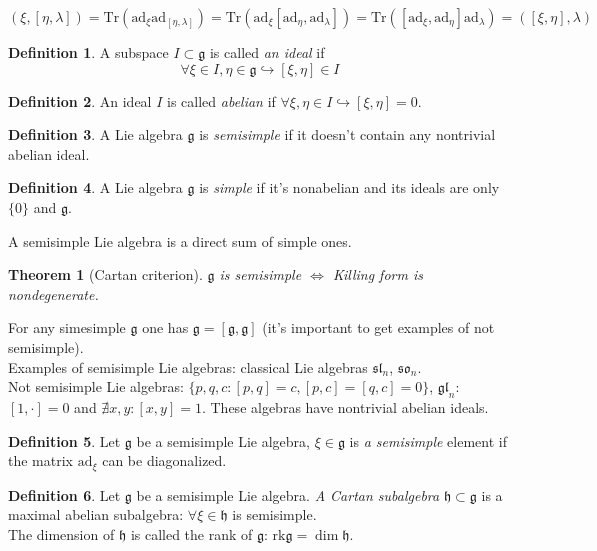 \documentclass[12pt]{article}
\newtheorem{theorem}{Theorem}[]
\theoremstyle{definition}
\newtheorem{defin}{Definition}[]
\begin{document}
\begin{equation}
    (\xi,[\eta,\lambda])=\text{Tr}(\text{ad}_\xi\text{ad}_{[\eta,\lambda]})=\text{Tr}(\text{ad}_\xi[\text{ad}_\eta,\text{ad}_\lambda])=\text{Tr}([\text{ad}_\xi,\text{ad}_\eta]\text{ad}_\lambda)=([\xi,\eta],\lambda)
\end{equation}
\begin{defin}
    A subspace $I\subset\mathfrak{g}$ is called \textit{an ideal} if
    \begin{equation}
        \forall\xi\in I,\eta\in\mathfrak{g}\hookrightarrow[\xi,\eta]\in I
    \end{equation}
\end{defin}
\begin{defin}
    An ideal $I$ is called \textit{abelian} if $\forall\xi,\eta\in I\hookrightarrow[\xi,\eta]=0$.
\end{defin}
\begin{defin}
    A Lie algebra $\mathfrak{g}$ is \textit{semisimple} if it doesn't contain any nontrivial abelian ideal.
\end{defin}
\begin{defin}
    A Lie algebra $\mathfrak{g}$ is \textit{simple} if it's nonabelian and its ideals are only $\{0\}$ and $\mathfrak{g}$.
\end{defin}
A semisimple Lie algebra is a direct sum of simple ones.
\begin{theorem}[Cartan criterion]
    $\mathfrak{g}$ is semisimple $\Leftrightarrow$ Killing form is nondegenerate.
\end{theorem}
For any simesimple $\mathfrak{g}$ one has $\mathfrak{g}=[\mathfrak{g},\mathfrak{g}]$ (it's important to get examples of not semisimple).\\
Examples of semisimple Lie algebras: classical Lie algebras $\mathfrak{sl}_n$, $\mathfrak{so}_n$.\\
Not semisimple Lie algebras: $\{p,q,c:[p,q]=c,[p,c]=[q,c]=0\}$, $\mathfrak{gl}_n$: $[1,\cdot]=0$ and $\nexists x,y:[x,y]=1$. These algebras have nontrivial abelian ideals.
\begin{defin}
    Let $\mathfrak{g}$ be a semisimple Lie algebra, $\xi\in\mathfrak{g}$ is \textit{a semisimple} element if the matrix $\text{ad}_\xi$ can be diagonalized.
\end{defin}
\begin{defin}
    Let $\mathfrak{g}$ be a semisimple Lie algebra. \textit{A Cartan subalgebra} $\mathfrak{h}\subset\mathfrak{g}$ is a maximal abelian subalgebra: $\forall\xi\in\mathfrak{h}$ is semisimple.\\
    The dimension of $\mathfrak{h}$ is called the rank of $\mathfrak{g}$: $\text{rk}\mathfrak{g}=\dim\mathfrak{h}$.
\end{defin}
\end{document}
